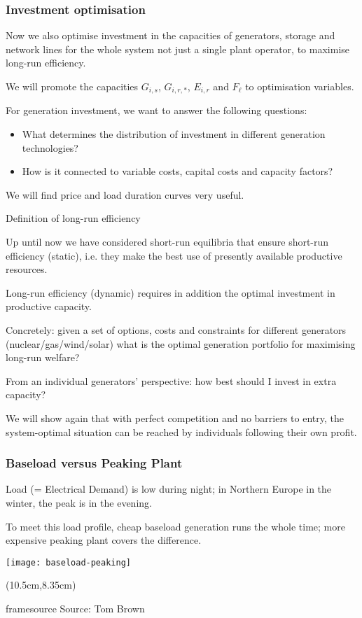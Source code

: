 \documentclass[10pt,aspectratio=169,dvipsnames]{beamer}
\newcommand{\source}[1]{\begin{textblock*}{5cm}(10.5cm,8.35cm)
    \begin{beamercolorbox}[ht=0.5cm,right]{framesource}
        \usebeamerfont{framesource}\usebeamercolor[fg]{framesource} Source: {#1}
    \end{beamercolorbox}
\end{textblock*}}
\let\olditem\item
\renewcommand{\item}{%
\olditem\vspace{5pt}}
\begin{document}
\begin{frame}[fragile]
  \frametitle{Investment optimisation}

 Now we also optimise \alert{investment} in the \alert{capacities} of generators,
  storage and network lines for the \alert{whole system} not just a single plant operator, to maximise \alert{long-run efficiency}.

  We will promote the capacities $G_{i,s}$, $G_{i,r,*}$, $E_{i,r}$ and
  $F_{\ell}$ to optimisation variables.

  For generation investment, we want to answer the following questions:
  \begin{itemize}
    \item What determines the distribution of investment in different generation technologies?
    \item How is it connected to variable costs, capital costs and capacity factors?
  \end{itemize}

  We will find price and load duration curves very useful.
\end{frame}


\begin{frame}{Definition of long-run efficiency}

  Up until now we have considered \alert{short-run} equilibria that
  ensure \alert{short-run} efficiency (static), i.e. they make the best use of
  presently available productive resources.

  \alert{Long-run} efficiency (dynamic) requires in addition the optimal
  investment in productive capacity.

  Concretely: given a set of options, costs and constraints for different
  generators (nuclear/gas/wind/solar) what is the optimal generation
  portfolio for maximising long-run welfare?

  From an individual generators' perspective: how best should I invest in extra capacity?

  We will show again that with perfect competition and no barriers to
  entry, the system-optimal situation can be reached by individuals
  following their own profit.

\end{frame}



\begin{frame}
  \frametitle{Baseload versus Peaking Plant}

  \alert{Load} (= Electrical Demand) is low during night; in Northern Europe in the winter, the peak is in the evening.

  To meet this load profile, cheap \alert{baseload} generation runs the whole time; more expensive \alert{peaking plant} covers the difference.

  \centering
  \texttt{[image: baseload-peaking]}

  \source{Tom Brown}

\end{frame}
\end{document}
